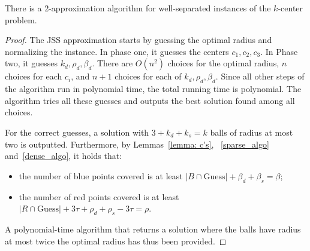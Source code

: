 \begin{theorem}
    There is a 2-approximation algorithm for well-separated instances of the $k$-center problem.
\end{theorem}

\begin{proof}
The JSS approximation starts by guessing the optimal radius and normalizing the instance. In phase one, it guesses the centers $c_1, c_2, c_3$. In Phase two, it guesses $k_d, \rho_d, \beta_d$. There are $O(n^2)$ choices for the optimal radius, $n$ choices for each $c_i$, and $n+1$ choices for each of $k_d, \rho_d, \beta_d$. Since all other steps of the algorithm run in polynomial time, the total running time is polynomial. The algorithm tries all these guesses and outputs the best solution found among all choices.

For the correct guesses, a solution with $3 + k_d + k_s = k$ balls of radius at most two is outputted. Furthermore, by Lemmas~\ref{lemma: c's}, ~\ref{sparse_algo} and~\ref{dense_algo}, it holds that:
\begin{itemize}
    \item the number of blue points covered is at least $|B \cap \mathrm{Guess}| + \beta_d + \beta_s = \beta$;
    \item the number of red points covered is at least $|R \cap \mathrm{Guess}| + 3\tau + \rho_d + \rho_s - 3\tau = \rho$.
\end{itemize}
A polynomial-time algorithm that returns a solution where the balls have radius at most twice the optimal radius has thus been provided.
\end{proof}
